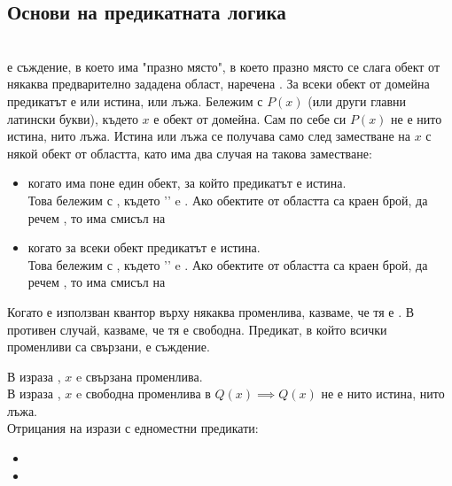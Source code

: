 \subsection{Основи на предикатната логика}
\\
 е съждение, в което има "празно място", в което празно място се слага обект от 
някаква предварително зададена област, наречена . За всеки обект от домейна предикатът е
или истина, или лъжа. Бележим с \(P(x)\) (или други главни латински букви), където \(x\) е обект от 
домейна. Сам по себе си \(P(x)\) не е нито истина, нито лъжа. Истина или лъжа се получава само след 
заместване на \(x\) с някой обект от областта, като има два случая на такова заместване:
\begin{itemize}
    \item когато има поне един обект, за който предикатът е истина. \\
    Това бележим с , където '\mexpr{\exists}' e .
    Ако обектите от областта са краен брой, да речем , то 
    има смисъл на 
    \item когато за всеки обект предикатът е истина. \\
    Това бележим с , където '\mexpr{\forall}' e .
    Ако обектите от областта са краен брой, да речем , то 
    има смисъл на 
\end{itemize}

Когато е използван квантор върху някаква променлива, казваме, че тя е . В противен случай, 
казваме, че тя е свободна. Предикат, в който всички променливи са свързани, е съждение.

В израза , \(x\) e свързана 
променлива. \\
В израза , \(x\) e свободна променлива
в \(Q(x) \implies Q(x)\) не е нито истина, нито лъжа. \\

Отрицания на изрази с едноместни предикати:
\begin{itemize}
    \item {}
    \item {}
\end{itemize}

